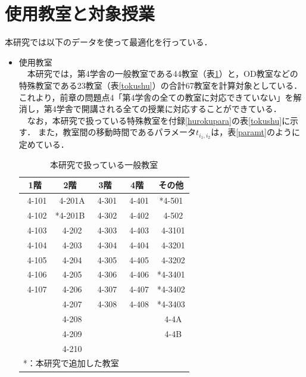 \documentclass[12pt, a4paper, fleqn]{jreport}
\begin{document}
\section{使用教室と対象授業}
本研究では以下のデータを使って最適化を行っている．
\begin{itemize}
\item 使用教室\\
　本研究では，第4学舎の一般教室である44教室（表\ref{hkyousitu}）と，OD教室などの特殊教室である23教室（表\ref{tokushu}）の合計67教室を計算対象としている．
これより，前章の問題点4「第4学舎の全ての教室に対応できていない」を解消し，第4学舎で開講される全ての授業に対応することができている．\\
　なお，本研究で扱っている特殊教室を付録\ref{hurokupara}の表\ref{tokushu}に示す．
また，教室間の移動時間であるパラメータ$t_{i_1,i_2}$は，表\ref{paramt}のように定めている．


\begin{table}[!h]
\begin{center}
\caption{本研究で扱っている一般教室}
\label{hkyousitu}
\begin{tabular}{|c|c|c|c|c|}
\hline
1階 & 2階 & 3階 & 4階 & その他\\
\hline\hline
\ 4-101  & \ 4-201A & \ 4-301  &  \ 4-401  & *4-501  \\
\ 4-102  & *4-201B  & \ 4-302  &  \ 4-402  &\ 4-502  \\
\ 4-103  & \ 4-202  & \ 4-303  &  \ 4-403  &\ 4-3101 \\
\ 4-104  & \ 4-203  & \ 4-304  &  \ 4-404  &\ 4-3201 \\
\ 4-105  & \ 4-204  & \ 4-305  &  \ 4-405  &\ 4-3202 \\
\ 4-106  & \ 4-205  & \ 4-306  &  \ 4-406  & *4-3401 \\
\ 4-107  & \ 4-206  & \ 4-307  &  \ 4-407  & *4-3402 \\
         & \ 4-207  & \ 4-308  &  \ 4-408  & *4-3403 \\
         & \ 4-208  &          &           &\ 4-4A   \\
         & \ 4-209  &          &           &\ 4-4B   \\
         & \ 4-210  &          &           &         \\
\hline
\multicolumn{5}{l}{*：本研究で追加した教室}\\
\end{tabular}
\end{center}
\end{table}



\end{itemize}
\end{document}

